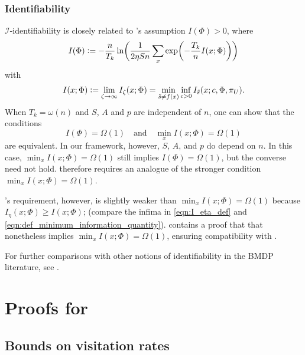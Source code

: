 \documentclass[11pt]{article}
\newcommand{\eqdef}{\vcentcolon=}
\newcommand{\mcI}{\mathcal{I}}
\theoremstyle{definition}
\theoremstyle{definition}
\begin{document}
\subsubsection{Identifiability}
\label{sec:comparison_to_other_identifiability_conditions}

$\mcI$-identifiability is closely related to \cite[Theorem 3]{Jedra:2022}'s assumption $I(\Phi)>0$, where
\begin{equation}
	I(\Phi)
	\eqdef
	-\frac{n}{T_k}\ln\biggl(\frac{1}{2\eta Sn} \sum_x\exp\biggl(-\frac{T_k}{n}I(x;\Phi)\biggr)\biggr)
\end{equation}
with
\begin{equation}
	\label{eqn:def_minimum_information_quantity}
	I(x;\Phi)
	\eqdef
	\lim_{\zeta\rightarrow \infty}I_{\zeta}(x;\Phi)
	=
	\min_{\tilde{s}\neq f(x)}\inf_{c>0}I_{\tilde{s}}(x;c,\Phi,\pi_U)
	.
\end{equation}
When $T_k=\omega(n)$ and $S$, $A$ and $p$ are independent of $n$, one can show that the conditions
\begin{equation}
	I(\Phi)=\Omega(1)\quad\mathrm{and}\quad\min_{x}I(x;\Phi)=\Omega(1)
\end{equation}
are equivalent.
In our framework, however, $S$, $A$, and $p$ do depend on $n$.
In this case, $\min_{x}I(x;\Phi)=\Omega(1)$ still implies $I(\Phi)=\Omega(1)$, but the converse need not hold.
 therefore requires an analogue of the stronger condition $\min_{x}I(x;\Phi)=\Omega(1)$.

's requirement, however, is slightly weaker than $\min_{x}I(x;\Phi)=\Omega(1)$ because $I_{\eta}(x;\Phi)\geq I(x;\Phi)$; (compare the infima in \eqref{eqn:I_eta_def} and \eqref{eqn:def_minimum_information_quantity}).
 contains a proof that that  nonetheless implies $\min_{x}I(x;\Phi)=\Omega(1)$, ensuring compatibility with \cite{Jedra:2022}.

For further comparisons with other notions of identifiability in the \gls{BMDP} literature, see \cite[Appendix D.3.5]{Jedra:2022}.


\section{Proofs for \texorpdfstring{}{the regret lower bound}}

\subsection{Bounds on visitation rates}
\end{document}
